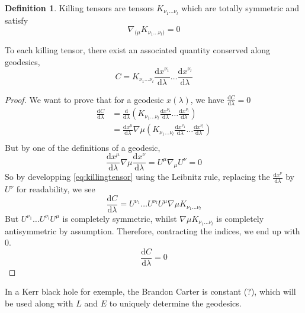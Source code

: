 \documentclass[a4paper]{book}
\theoremstyle{definition}
\newtheorem{definition}{Definition}[section]
\theoremstyle{remark}
\begin{document}
\begin{definition}
    Killing tensors are tensors $K_{\nu_1\dots \nu_l}$ which are totally symmetric and satisfy 
    \begin{equation}
        \nabla_{(\mu} K_{\nu_1\dots \nu_l)} = 0
    \end{equation}
\end{definition}
To each killing tensor, there exist an associated quantity conserved along geodesics, 
\begin{equation}
    C = K_{\nu_1\dots \nu_l} \frac{\text{d}x^{\nu_1}}{\text{d}\lambda} \dots \frac{\text{d}x^{\nu_l}}{\text{d}\lambda}
\end{equation}
\begin{proof}
    We want to prove that for a geodesic $x(\lambda)$, we have $\frac{\text{d}C}{\text{d}\lambda} = 0$
    \begin{equation}
        \begin{aligned}
            \frac{\text{d}C}{\text{d}\lambda} &= \frac{\text{d}}{\text{d}\lambda}\left(K_{\nu_1\dots \nu_l} \frac{\text{d}x^{\nu_1}}{\text{d}\lambda} \dots \frac{\text{d}x^{\nu_l}}{\text{d}\lambda}\right) \\
            &= \frac{\text{d}x^\mu}{\text{d}\lambda}\nabla\mu\left(K_{\nu_1\dots \nu_l} \frac{\text{d}x^{\nu_1}}{\text{d}\lambda} \dots \frac{\text{d}x^{\nu_l}}{\text{d}\lambda}\right) \\
        \end{aligned}
    \label{eq:killingtensor}\end{equation}
    But by one of the definitions of a geodesic, 
    \begin{equation}
        \frac{\text{d}x^\mu}{\text{d}\lambda}\nabla\mu \frac{\text{d}x^{\nu}}{\text{d}\lambda} = U^\mu \nabla_\mu U^\nu = 0
    \end{equation}
    So by developping \eqref{eq:killingtensor} using the Leibnitz rule, replacing the $\frac{\text{d}x^{\nu}}{\text{d}\lambda}$ by $U^\nu$ for readability, we see 
    \begin{equation}
        \frac{\text{d}C}{\text{d}\lambda} = U^{\nu_1}\dots U^{\nu_l} U^\mu \nabla\mu K_{\nu_1\dots \nu_l} 
    \end{equation}
    But $U^{\nu_1}\dots U^{\nu_l} U^\mu$ is completely symmetric, whilst $\nabla\mu K_{\nu_1\dots \nu_l} $ is completely antisymmetric by assumption. Therefore, contracting the indices, we end up with 0. 
    \begin{equation}
        \frac{\text{d}C}{\text{d}\lambda} = 0
    \end{equation}
\end{proof}
In a Kerr black hole for exemple, the Brandon Carter is constant (?), which will be used along with $L$ and $E$ to uniquely determine the geodesics. \par \medskip 
\end{document}
